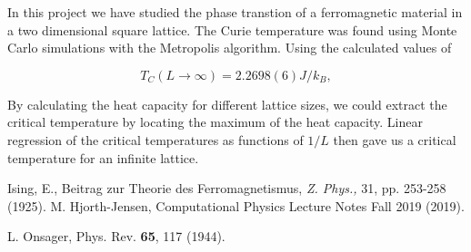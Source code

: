 \documentclass{article}
\begin{document}
In this project we have studied the phase transtion of a ferromagnetic material in a  two dimensional square lattice. The Curie temperature was found using Monte Carlo simulations with the Metropolis algorithm. Using the calculated values of 




\begin{equation}
T_C(L\to\infty) = 2.2698(6)J/k_B,
\end{equation}

By calculating the heat capacity for different lattice sizes, we could extract the critical temperature by locating the maximum of the heat capacity. Linear regression of the critical temperatures as functions of $1/L$ then gave us a critical temperature for an infinite lattice.



\begin{thebibliography}{9}

 Ising, E., Beitrag zur Theorie des Ferromagnetismus,
	\emph{Z. Phys.,} 31, pp. 253-258 (1925).
 M. Hjorth-Jensen, Computational Physics Lecture Notes Fall 2019 (2019).

     L. Onsager, Phys. Rev. \textbf{65}, 117 (1944).


\end{thebibliography}
\end{document}

